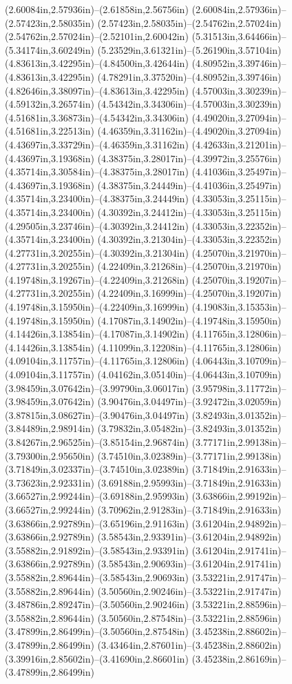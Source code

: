 (2.60084in,2.57936in)--(2.61858in,2.56756in) (2.60084in,2.57936in)--(2.57423in,2.58035in) (2.57423in,2.58035in)--(2.54762in,2.57024in) (2.54762in,2.57024in)--(2.52101in,2.60042in) (5.31513in,3.64466in)--(5.34174in,3.60249in) (5.23529in,3.61321in)--(5.26190in,3.57104in) (4.83613in,3.42295in)--(4.84500in,3.42644in) (4.80952in,3.39746in)--(4.83613in,3.42295in) (4.78291in,3.37520in)--(4.80952in,3.39746in) (4.82646in,3.38097in)--(4.83613in,3.42295in) (4.57003in,3.30239in)--(4.59132in,3.26574in) (4.54342in,3.34306in)--(4.57003in,3.30239in) (4.51681in,3.36873in)--(4.54342in,3.34306in) (4.49020in,3.27094in)--(4.51681in,3.22513in) (4.46359in,3.31162in)--(4.49020in,3.27094in) (4.43697in,3.33729in)--(4.46359in,3.31162in) (4.42633in,3.21201in)--(4.43697in,3.19368in) (4.38375in,3.28017in)--(4.39972in,3.25576in) (4.35714in,3.30584in)--(4.38375in,3.28017in) (4.41036in,3.25497in)--(4.43697in,3.19368in) (4.38375in,3.24449in)--(4.41036in,3.25497in) (4.35714in,3.23400in)--(4.38375in,3.24449in) (4.33053in,3.25115in)--(4.35714in,3.23400in) (4.30392in,3.24412in)--(4.33053in,3.25115in) (4.29505in,3.23746in)--(4.30392in,3.24412in) (4.33053in,3.22352in)--(4.35714in,3.23400in) (4.30392in,3.21304in)--(4.33053in,3.22352in) (4.27731in,3.20255in)--(4.30392in,3.21304in) (4.25070in,3.21970in)--(4.27731in,3.20255in) (4.22409in,3.21268in)--(4.25070in,3.21970in) (4.19748in,3.19267in)--(4.22409in,3.21268in) (4.25070in,3.19207in)--(4.27731in,3.20255in) (4.22409in,3.16999in)--(4.25070in,3.19207in) (4.19748in,3.15950in)--(4.22409in,3.16999in) (4.19083in,3.15353in)--(4.19748in,3.15950in) (4.17087in,3.14902in)--(4.19748in,3.15950in) (4.14426in,3.13854in)--(4.17087in,3.14902in) (4.11765in,3.12806in)--(4.14426in,3.13854in) (4.11099in,3.12208in)--(4.11765in,3.12806in) (4.09104in,3.11757in)--(4.11765in,3.12806in) (4.06443in,3.10709in)--(4.09104in,3.11757in) (4.04162in,3.05140in)--(4.06443in,3.10709in) (3.98459in,3.07642in)--(3.99790in,3.06017in) (3.95798in,3.11772in)--(3.98459in,3.07642in) (3.90476in,3.04497in)--(3.92472in,3.02059in) (3.87815in,3.08627in)--(3.90476in,3.04497in) (3.82493in,3.01352in)--(3.84489in,2.98914in) (3.79832in,3.05482in)--(3.82493in,3.01352in) (3.84267in,2.96525in)--(3.85154in,2.96874in) (3.77171in,2.99138in)--(3.79300in,2.95650in) (3.74510in,3.02389in)--(3.77171in,2.99138in) (3.71849in,3.02337in)--(3.74510in,3.02389in) (3.71849in,2.91633in)--(3.73623in,2.92331in) (3.69188in,2.95993in)--(3.71849in,2.91633in) (3.66527in,2.99244in)--(3.69188in,2.95993in) (3.63866in,2.99192in)--(3.66527in,2.99244in) (3.70962in,2.91283in)--(3.71849in,2.91633in) (3.63866in,2.92789in)--(3.65196in,2.91163in) (3.61204in,2.94892in)--(3.63866in,2.92789in) (3.58543in,2.93391in)--(3.61204in,2.94892in) (3.55882in,2.91892in)--(3.58543in,2.93391in) (3.61204in,2.91741in)--(3.63866in,2.92789in) (3.58543in,2.90693in)--(3.61204in,2.91741in) (3.55882in,2.89644in)--(3.58543in,2.90693in) (3.53221in,2.91747in)--(3.55882in,2.89644in) (3.50560in,2.90246in)--(3.53221in,2.91747in) (3.48786in,2.89247in)--(3.50560in,2.90246in) (3.53221in,2.88596in)--(3.55882in,2.89644in) (3.50560in,2.87548in)--(3.53221in,2.88596in) (3.47899in,2.86499in)--(3.50560in,2.87548in) (3.45238in,2.88602in)--(3.47899in,2.86499in) (3.43464in,2.87601in)--(3.45238in,2.88602in) (3.39916in,2.85602in)--(3.41690in,2.86601in) (3.45238in,2.86169in)--(3.47899in,2.86499in) 